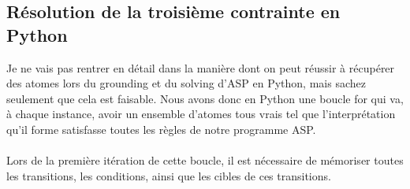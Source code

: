\documentclass[12pt,a4paper]{article}
\begin{document}
\subsection{Résolution de la troisième contrainte en Python}
Je ne vais pas rentrer en détail dans la manière dont on peut réussir à récupérer des atomes lors du grounding et du solving d'ASP en Python, mais sachez seulement que cela est faisable. Nous avons donc en Python une boucle for 
qui va, à chaque instance, avoir un ensemble d'atomes tous vrais tel que l'interprétation qu'il forme satisfasse toutes les règles de notre programme ASP.\\ \\
Lors de la première itération de cette boucle, il est nécessaire de mémoriser toutes les transitions, les conditions, ainsi que les cibles de ces transitions.\\ \\
\end{document}
